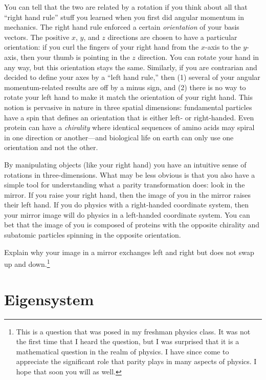 \documentclass[12pt, oneside]{report}    %
\begin{document}
\begin{subappendices}
You can tell that the two are related by a rotation if you think about all that ``right hand rule'' stuff you learned when you first did angular momentum in mechanics. The right hand rule enforced a certain \emph{orientation} of your basis vectors. The positive $x$, $y$, and $z$ directions are chosen to have a particular orientation: if you curl the fingers of your right hand from the $x$-axis to the $y$-axis, then your thumb is pointing in the $z$ direction. You can rotate your hand in any way, but this orientation stays the same. Similarly, if you are contrarian and decided to define your axes by a ``left hand rule,'' then (1) several of your angular momentum-related results are off by a minus sign, and (2) there is no way to rotate your left hand to make it match the orientation of your right hand. This notion is pervasive in nature in three spatial dimensions: fundamental particles have a spin that defines an orientation that is either left- or right-handed. Even protein can have a \emph{chirality} where identical sequences of amino acids may spiral in one direction or another---and biological life on earth can only use one orientation and not the other. 

By manipulating objects (like your right hand) you have an intuitive sense of rotations in three-dimensions. What may be less obvious is that you also have a simple tool for understanding what a parity transformation does: look in the mirror. If you raise your right hand, then the image of you in the mirror raises their left hand. If you do physics with a right-handed coordinate system, then your mirror image will do physics in a left-handed coordinate system. You can bet that the image of you is composed of proteins with the opposite chirality and subatomic particles spinning in the opposite orientation. 
\begin{exercise}
Explain why your image in a mirror exchanges left and right but does not swap up and down.\footnote{This is a question that was posed in my freshman physics class. It was not the first time that I heard the question, but I was surprised that it is a mathematical question in the realm of physics. I have since come to appreciate the significant role that parity plays in many aspects of physics. I hope that soon you will as well.}
\end{exercise}


\end{subappendices}


\chapter{Eigensystem}
\end{document}
